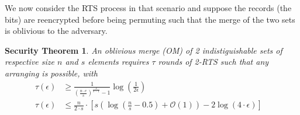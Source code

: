 \documentclass[english,oneside,twocolumn]{article}
\newtheorem{secthm}{Security Theorem}
\begin{document}
We now consider the RTS process in that scenario and suppose the records (the bits) are reencrypted before being permuting such that the merge of the two sets is oblivious to the adversary.

\begin{secthm}
An oblivious merge (OM) of 2 indistiguishable sets of respective size $n$ and $s$ elements requires $\tau$ rounds of 2-RTS such that any arranging is possible, with
\begin{align*}
\tau(\epsilon) &\geq \frac{1}{(\frac{n\cdot e}{s})^{\frac{s}{s-1}}-1} \log\left(\frac{1}{2 \epsilon} \right) &\\
\tau(\epsilon) &\leq \frac{n}{2\cdot s}  \cdot \left [ s \left( \log \left (\frac{n}{s}-0.5\right) +\mathcal{O}\left(1\right) \right ) - 2\log \left( 4 \cdot \epsilon\right) \right ] &\\
\end{align*}
\end{secthm}
\end{document}
